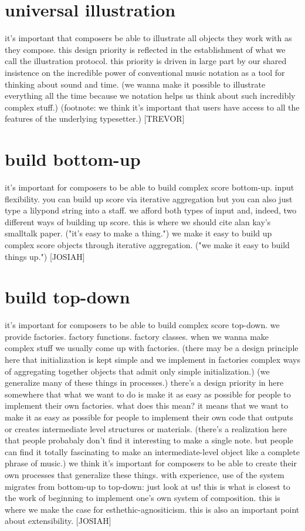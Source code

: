 \documentclass{article}
\begin{document}
\section{universal illustration}
it's important that composers be able to
illustrate all objects they work with as they compose. this design priority is
reflected in the establishment of what we call the illustration protocol. this
priority is driven in large part by our shared insistence on the incredible
power of conventional music notation as a tool for thinking about sound and
time. (we wanna make it possible to illustrate everything all the time because
we notation helps us think about such incredibly complex stuff.) (footnote: we
think it's important that users have access to all the features of the
underlying typesetter.) [TREVOR]

\section{build bottom-up}
it's important for composers to be able to build complex
score bottom-up. input flexibility. you can build up score via iterative
aggregation but you can also just type a lilypond string into a staff. we
afford both types of input and, indeed, two different ways of building up
score. this is where we should cite alan kay's smalltalk paper. ("it's easy to
make a thing.") we make it easy to build up complex score objects through
iterative aggregation. ("we make it easy to build things up.") [JOSIAH]

\section{build top-down}
it's important for composers to be able to build complex
score top-down. we provide factories. factory functions. factory classes. when
we wanna make complex stuff we usually come up with factories. (there may be a
design principle here that initialization is kept simple and we implement in
factories complex ways of aggregating together objects that admit only simple
initialization.) (we generalize many of these things in processes.) there's a
design priority in here somewhere that what we want to do is make it as easy as
possible for people to implement their own factories. what does this mean? it
means that we want to make it as easy as possible for people to implement their
own code that outputs or creates intermediate level structures or materials.
(there's a realization here that people probabaly don't find it interesting to
make a single note. but people can find it totally fascinating to make an
intermediate-level object like a complete phrase of music.) we think it's
important for composers to be able to create their own processes that
generalize these things. with experience, use of the system migrates from
bottom-up to top-down: just look at us! this is what is closest to the work of
beginning to implement one's own system of composition. this is where we make
the case for esthethic-agnositicism. this is also an important point about
extensibility. [JOSIAH]
\end{document}
